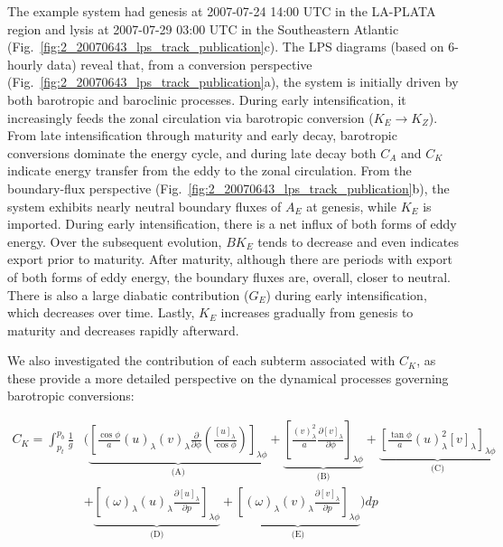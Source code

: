 \documentclass[pdflatex,sn-chicago]{sn-jnl}%
\theoremstyle{plain}
\theoremstyle{definition}
\theoremstyle{remark}
\theoremstyle{definition}
\begin{document}
The example system had genesis at 2007-07-24 14:00 UTC in the LA-PLATA region and lysis at 2007-07-29 03:00 UTC in the Southeastern Atlantic (Fig.~\ref{fig:2_20070643_lps_track_publication}c). The LPS diagrams (based on 6-hourly data) reveal that, from a conversion perspective (Fig.~\ref{fig:2_20070643_lps_track_publication}a), the system is initially driven by both barotropic and baroclinic processes. During early intensification, it increasingly feeds the zonal circulation via barotropic conversion ($K_E \rightarrow K_Z$). From late intensification through maturity and early decay, barotropic conversions dominate the energy cycle, and during late decay both $C_A$ and $C_K$ indicate energy transfer from the eddy to the zonal circulation. From the boundary-flux perspective (Fig.~\ref{fig:2_20070643_lps_track_publication}b), the system exhibits nearly neutral boundary fluxes of $A_E$ at genesis, while $K_E$ is imported. During early intensification, there is a net influx of both forms of eddy energy. Over the subsequent evolution, $BK_E$ tends to decrease and even indicates export prior to maturity. After maturity, although there are periods with export of both forms of eddy energy, the boundary fluxes are, overall, closer to neutral. There is also a large diabatic contribution ($G_E$) during early intensification, which decreases over time. Lastly, $K_E$ increases gradually from genesis to maturity and decreases rapidly afterward.


We also investigated the contribution of each subterm associated with $C_K$, as these provide a more detailed perspective on the dynamical processes governing barotropic conversions:


\begin{equation}
\begin{split}
C_K = \int_{p_t}^{p_b} \frac{1}{g}  & \Bigg( \underbrace{ \left[ \frac{\cos\phi}{a} (u)_{\lambda} (v)_{\lambda} \frac{\partial}{\partial\phi} \left(\frac{[u]_{\lambda}}{\cos\phi}\right) \right]_{\lambda\phi}}_{\text{(A)}} + \underbrace{\left[ \frac{(v)_{\lambda}^2}{a} \frac{\partial [v]_{\lambda}}{\partial\phi}\right]_{\lambda\phi}}_{\text{(B)}} + \underbrace{\left[ \frac{\tan\phi}{a} (u)_{\lambda}^2 [v]_{\lambda}\right]_{\lambda\phi}}_{\text{(C)}} \\
& + \underbrace{ \left[(\omega)_{\lambda}  (u)_{\lambda} \frac{\partial [u]_{\lambda}}{\partial p}\right]_{\lambda\phi}}_{\text{(D)}} + \underbrace{ \left[(\omega)_{\lambda}  (v)_{\lambda} \frac{\partial [v]_{\lambda}}{\partial p}\right]_{\lambda\phi}}_{\text{(E)}} \Bigg)  dp
\end{split}
\label{eq:CK}
\end{equation}
\end{document}
